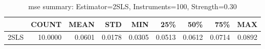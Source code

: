 \begin{table}[ht]
\centering
\caption{mse summary: Estimator=2SLS, Instruments=100, Strength=0.30}
\begin{tabular}{lrrrrrrrr}
\toprule
 & COUNT & MEAN & STD & MIN & 25\% & 50\% & 75\% & MAX \\
\midrule
2SLS & 10.0000 & 0.0601 & 0.0178 & 0.0305 & 0.0513 & 0.0612 & 0.0714 & 0.0892 \\
\bottomrule
\end{tabular}
\end{table}
